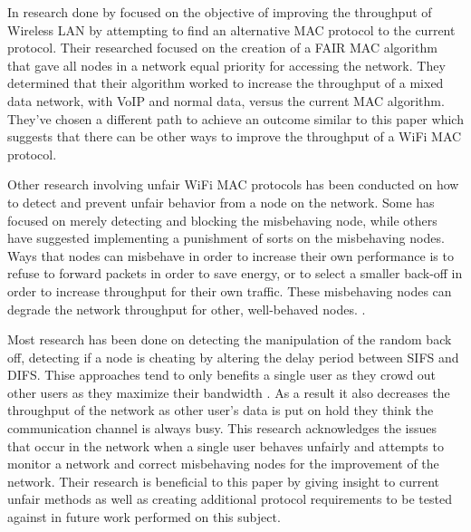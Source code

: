 \documentclass{sigcomm-alternate}
\begin{document}
In research done by \cite{Lucani} focused on the objective of improving the throughput of Wireless LAN by attempting to find an alternative MAC protocol to the current protocol. Their researched focused on the creation of a FAIR  MAC algorithm \cite{Lucani} that gave all nodes in a network equal priority for accessing the network. They determined that their algorithm worked to increase the throughput of a mixed data network, with VoIP and normal data, versus the current MAC algorithm. They've chosen a different path to achieve an outcome similar to this paper which suggests that there can be other ways to improve the throughput of a WiFi MAC protocol.

Other research involving unfair WiFi MAC protocols has been conducted on how to detect and prevent unfair behavior from a node on the network. Some has focused on merely detecting and blocking the misbehaving node, while others have suggested implementing a punishment of sorts on the misbehaving nodes. Ways that nodes can misbehave in order to increase their own performance is to refuse to forward packets in order to save energy, or to select a smaller back-off in order to increase throughput for their own traffic. These misbehaving nodes can degrade the network throughput for other, well-behaved nodes. \cite{Kyasanur}. 	

Most research has been done on detecting the manipulation of the random back off\cite{Suresh}, detecting if a node is cheating by altering the delay period between SIFS and DIFS\cite{Domino}. Thise approaches tend to only benefits a single user as they crowd out other users as they maximize their bandwidth \cite{Domino}. As a result it also decreases the throughput of the network as other user's data is put on hold they think the communication channel is always busy. This research acknowledges the issues that occur in the network when a single user behaves unfairly and attempts to monitor a network and correct misbehaving nodes for the improvement of the network. Their research is beneficial to this paper by giving insight to current unfair methods as well as creating additional protocol requirements to be tested against in future work performed on this subject.
\end{document}
